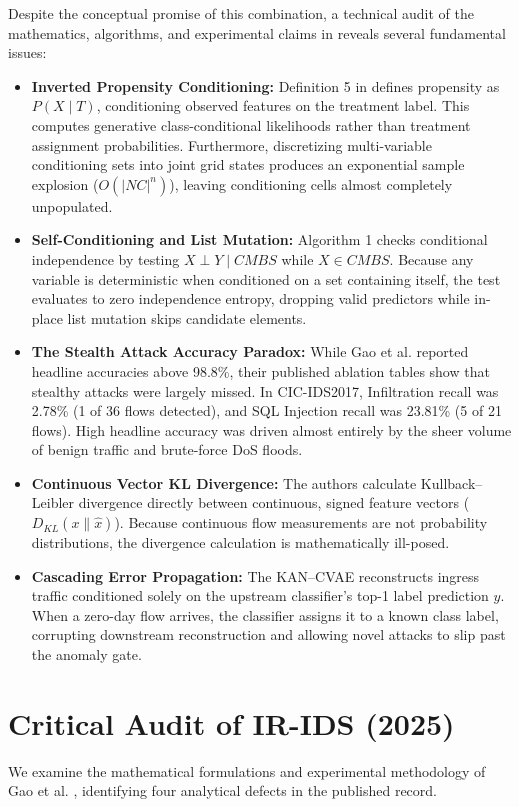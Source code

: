 \documentclass[5p,times,twocolumn]{elsarticle}
\begin{document}
Despite the conceptual promise of this combination, a technical audit of the mathematics, algorithms, and experimental claims in \cite{gao2025irids} reveals several fundamental issues:
\begin{itemize}
    \item \textbf{Inverted Propensity Conditioning:} Definition 5 in \cite{gao2025irids} defines propensity as $P(X \mid T)$, conditioning observed features on the treatment label. This computes generative class-conditional likelihoods rather than treatment assignment probabilities. Furthermore, discretizing multi-variable conditioning sets into joint grid states produces an exponential sample explosion ($O(|NC|^n)$), leaving conditioning cells almost completely unpopulated.
    \item \textbf{Self-Conditioning and List Mutation:} Algorithm 1 checks conditional independence by testing $X \perp Y \mid CMBS$ while $X \in CMBS$. Because any variable is deterministic when conditioned on a set containing itself, the test evaluates to zero independence entropy, dropping valid predictors while in-place list mutation skips candidate elements.
    \item \textbf{The Stealth Attack Accuracy Paradox:} While Gao et al. reported headline accuracies above 98.8\%, their published ablation tables show that stealthy attacks were largely missed. In CIC-IDS2017, Infiltration recall was 2.78\% (1 of 36 flows detected), and SQL Injection recall was 23.81\% (5 of 21 flows). High headline accuracy was driven almost entirely by the sheer volume of benign traffic and brute-force DoS floods.
    \item \textbf{Continuous Vector KL Divergence:} The authors calculate Kullback--Leibler divergence directly between continuous, signed feature vectors ($D_{KL}(x \parallel \hat{x})$). Because continuous flow measurements are not probability distributions, the divergence calculation is mathematically ill-posed.
    \item \textbf{Cascading Error Propagation:} The KAN--CVAE reconstructs ingress traffic conditioned solely on the upstream classifier's top-1 label prediction $\hat{y}$. When a zero-day flow arrives, the classifier assigns it to a known class label, corrupting downstream reconstruction and allowing novel attacks to slip past the anomaly gate.
\end{itemize}

\section{Critical Audit of IR-IDS (2025)}
We examine the mathematical formulations and experimental methodology of Gao et al. \cite{gao2025irids}, identifying four analytical defects in the published record.
\end{document}
